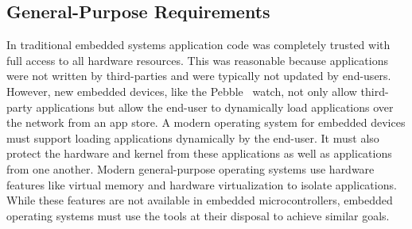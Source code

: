 

\subsection{General-Purpose Requirements}

In traditional embedded systems application code was completely trusted with
full access to all hardware resources. This was reasonable because applications
were not written by third-parties and were typically not updated by end-users.
However, new embedded devices, like the Pebble~\cite{pebble} watch, not only
allow third-party applications but allow the end-user to dynamically load
applications over the network from an app store.
A modern operating system for embedded devices must support loading applications
dynamically by the end-user. It must also protect the hardware and
kernel from these applications as well as applications from one another.
Modern general-purpose operating systems use hardware features like
virtual memory and hardware virtualization to isolate applications. While these
features are not available in embedded microcontrollers, embedded operating
systems must use the tools at their disposal to achieve similar goals.

